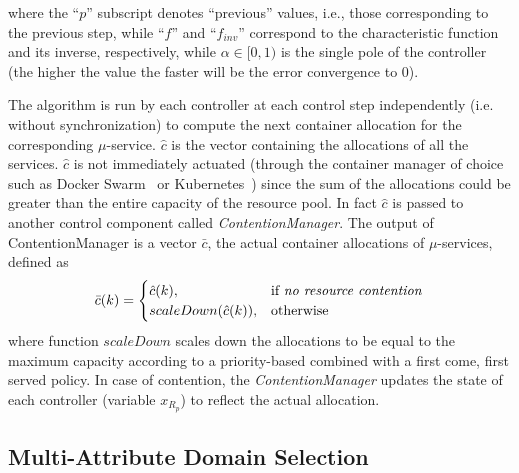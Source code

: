 where the ``$p$'' subscript denotes ``previous'' values, i.e., those corresponding to the previous step, while ``$f$'' and ``$f_{inv}$'' correspond to the characteristic function and its inverse, respectively, while $\alpha \in [0,1)$ is the single pole of the controller (the higher the value the faster will be the error convergence to $0$). 

The algorithm is run by each controller at each control step independently (i.e. without synchronization) to compute the next container allocation for the corresponding $\mu$-service. $\hat{c}$ is the vector containing the allocations of all the services. $\hat{c}$ is not immediately actuated (through the container manager of choice such as Docker Swarm~\cite{Swarm} or Kubernetes~\cite{Kubernetes}) since the sum of the allocations could be greater than the entire capacity of the resource pool. In fact $\hat{c}$  is passed to another control component called  \textit{ContentionManager}. The  output of ContentionManager is a vector $\bar{c}$, the actual container allocations of $\mu$-services, defined as 
{\scriptsize
\begin{equation}
\bar{c}(k) =
\begin{cases}
\hat{c}(k),& \text{if \textit{no resource contention}}\\
scaleDown(\hat{c}(k)),              & \text{otherwise}
\end{cases}
\label{eqn:CsysModel-SS}
\end{equation} 
}%
where function $scaleDown$ scales down the allocations to be equal to the maximum capacity according to a priority-based combined with a first come, first served policy. In case of contention, the \textit{ContentionManager} updates the state of each controller (variable $x_{R_p}$) to reflect the actual allocation.


\subsection{Multi-Attribute Domain Selection}~\label{sec:cs_allocation}

